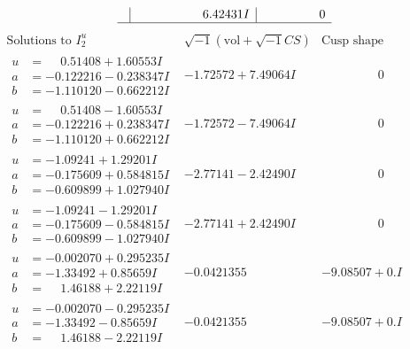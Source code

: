 \documentclass[1p]{elsarticle_modified}
\theoremstyle{definition}
\newcommand{\I}{\sqrt{-1}}
\begin{document}
$$\begin{array}{c|c|c}
 & \phantom{-0.000000 -}6.42431 I & \phantom{-0.000000 } 0\\
 \hline 
 \end{array}$$\newpage$$\begin{array}{c|c|c}  
\text{Solutions to }I^u_{2}& \I (\text{vol} + \sqrt{-1}CS) & \text{Cusp shape}\\
 \hline 
\begin{aligned}
u &= \phantom{-}0.51408 + 1.60553 I \\
a &= -0.122216 - 0.238347 I \\
b &= -1.110120 - 0.662212 I\end{aligned}
 & -1.72572 + 7.49064 I & \phantom{-0.000000 } 0 \\ \hline\begin{aligned}
u &= \phantom{-}0.51408 - 1.60553 I \\
a &= -0.122216 + 0.238347 I \\
b &= -1.110120 + 0.662212 I\end{aligned}
 & -1.72572 - 7.49064 I & \phantom{-0.000000 } 0 \\ \hline\begin{aligned}
u &= -1.09241 + 1.29201 I \\
a &= -0.175609 + 0.584815 I \\
b &= -0.609899 + 1.027940 I\end{aligned}
 & -2.77141 - 2.42490 I & \phantom{-0.000000 } 0 \\ \hline\begin{aligned}
u &= -1.09241 - 1.29201 I \\
a &= -0.175609 - 0.584815 I \\
b &= -0.609899 - 1.027940 I\end{aligned}
 & -2.77141 + 2.42490 I & \phantom{-0.000000 } 0 \\ \hline\begin{aligned}
u &= -0.002070 + 0.295235 I \\
a &= -1.33492 + 0.85659 I \\
b &= \phantom{-}1.46188 + 2.22119 I\end{aligned}
 & -0.0421355\phantom{ +0.000000I} & -9.08507 + 0. I\phantom{ +0.000000I} \\ \hline\begin{aligned}
u &= -0.002070 - 0.295235 I \\
a &= -1.33492 - 0.85659 I \\
b &= \phantom{-}1.46188 - 2.22119 I\end{aligned}
 & -0.0421355\phantom{ +0.000000I} & -9.08507 + 0. I\phantom{ +0.000000I} \\ \hline\begin{aligned}

\end{aligned}
\end{array}$$
\end{document}
